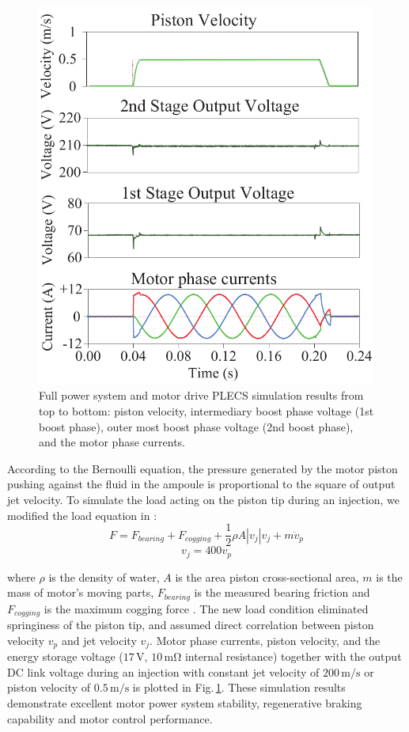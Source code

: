     \begin{figure}
      \centering
      \includegraphics[width=4.5in]{appA/images/Motor_performance.pdf}
      \caption{Full power system and motor drive PLECS simulation results from top to bottom: piston velocity, intermediary boost phase voltage (1st boost phase), outer most boost phase voltage (2nd boost phase), and the motor phase currents.}
      \label{fig:motor_performance}
    \end{figure}
    
    According to the Bernoulli equation, the pressure generated by the motor piston pushing against the fluid in the ampoule is proportional to the square of output jet velocity. To simulate the load acting on the piston tip during an injection, we modified the load equation in \cite{Modak2015}:
    \begin{equation}
    F=F_{bearing}+F_{cogging}+\frac{1}{2} \rho A\left| v_j \right| v_j+ m \ddot{v}_p
    \label{eq:AppendixA/1}
    \end{equation}
    \begin{equation}
    v_j=400 v_p
    \label{eq:AppendixA/2}
    \end{equation}
    
    where $\rho$ is the density of water, $A$ is the area piston cross-sectional area, $m$ is the mass of motor’s moving parts, $F_{bearing}$ is the measured bearing friction and $F_{cogging}$ is the maximum cogging force \cite{Do2017}. The new load condition eliminated springiness of the piston tip, and assumed direct correlation between piston velocity $v_p$ and jet velocity $v_j$. Motor phase currents, piston velocity, and the energy storage voltage ($17\,\mathrm{V}$, $10\,\mathrm{m\Omega}$ internal resistance) together with the output DC link voltage during an injection with constant jet velocity of $200\,\mathrm{m/s}$ or piston velocity of $0.5\,\mathrm{m/s}$ is plotted in Fig.\,\ref{fig:motor_performance}. These simulation results demonstrate excellent motor power system stability, regenerative braking capability and motor control performance.
    
